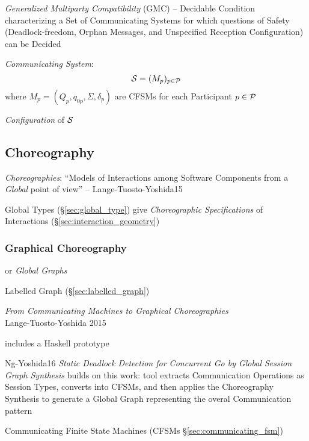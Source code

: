 \emph{Generalized Multiparty Compatibility} (GMC) -- Decidable
Condition characterizing a Set of Communicating Systems for which
questions of Safety (Deadlock-freedom, Orphan Messages, and
Unspecified Reception Configuration) can be Decided

\emph{Communicating System}:
\[
  \mathcal{S} = (M_p)_{p \in \mathcal{P}}
\]
where $M_p = (Q_p, q_{0p}, \Sigma, \delta_p)$ are CFSMs for each
Participant $p \in \mathcal{P}$

\emph{Configuration} of $\mathcal{S}$ %



\subsection{Choreography}\label{sec:choreography}

\emph{Choreographies}: ``Models of Interactions among Software
Components from a \emph{Global} point of view'' --
Lange-Tuosto-Yoshida15

\fist Global Types (\S\ref{sec:global_type}) give \emph{Choreographic
  Specifications} of Interactions (\S\ref{sec:interaction_geometry})



\subsubsection{Graphical Choreography}\label{sec:graphical_choreography}

or \emph{Global Graphs}

\fist Labelled Graph (\S\ref{sec:labelled_graph})

\begingroup

\newcommand{\party}{\mono}

\emph{From Communicating Machines to Graphical Choreographies} \\
Lange-Tuosto-Yoshida 2015

includes a Haskell prototype

Ng-Yoshida16 \emph{Static Deadlock Detection for Concurrent Go by
  Global Session Graph Synthesis} builds on this work: tool extracts
Communication Operations as Session Types, converts into CFSMs, and
then applies the Choreography Synthesis to generate a Global Graph
representing the overal Communication pattern

\fist Communicating Finite State Machines (CFSMs
\S\ref{sec:communicating_fsm})

